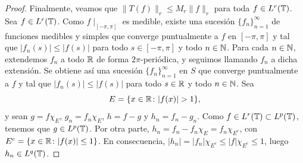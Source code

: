 \documentclass[a4paper, 12pt]{book}
\begin{document}
\begin{proof}
    Finalmente, veamos que $\|T(f)\|_r \leq M_r\|f\|_r$ para toda $f \in L^r(\mathbb T)$. Sea $f \in L^r(\mathbb T)$. Como $f\!\mid_{[-\pi,\pi]}$ es medible, existe una sucesión $\{f_n\}_{n=1}^\infty$ de funciones medibles y simples que converge puntualmente a $f$ en $[-\pi,\pi]$ y tal que $|f_n(s)|\leq |f(s)|$ para todo $s \in [-\pi,\pi]$ y todo $n \in \mathbb N$. Para cada $n \in \mathbb N$, extendemos $f_n$ a todo $\mathbb R$ de forma $2\pi$-periódica, y seguimos llamando $f_n$ a dicha extensión. Se obtiene así una sucesión $\{f_n\}_{n=1}^\infty$ en $S$ que converge puntualmente a $f$ y tal que $|f_n(s)| \leq |f(s)|$ para todo $s \in \mathbb R$ y todo $n \in \mathbb N$. Sea
    \[E = \{x \in \mathbb R \colon |f(x)| > 1\},\]
    y sean $g = f\chi_E$, $g_n = f_n\chi_E$, $h = f-g$ y $h_n = f_n-g_n$. Como $f \in L^r(\mathbb T) \subset L^p(\mathbb T)$, tenemos que $g \in L^p(\mathbb T)$. Por otra parte, $h_n = f_n-f_n\chi_{E} = f_n\chi_{E^c}$, con $E^c=\{x \in \mathbb R \colon |f(x)|\leq 1\}$. En consecuencia, $|h_n| =|f_n|\chi_{E^c} \leq |f|\chi_{E^c} \leq 1$, luego $h_n \in L^q(\mathbb T)$.


\end{proof}
\end{document}
